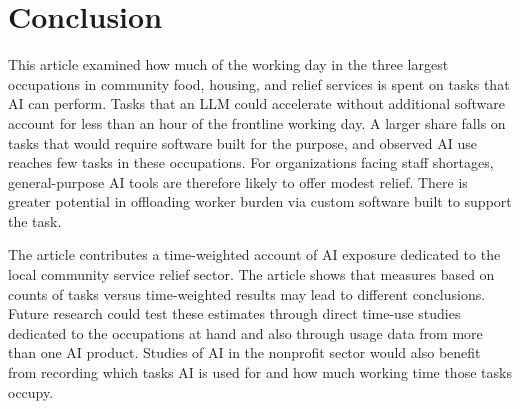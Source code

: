 \section{Conclusion}

This article examined how much of the working day in the three largest occupations in community food, housing, and relief services is spent on tasks that AI can perform. Tasks that an LLM could accelerate without additional software account for less than an hour of the frontline working day. A larger share falls on tasks that would require software built for the purpose, and observed AI use reaches few tasks in these occupations. For organizations facing staff shortages, general-purpose AI tools are therefore likely to offer modest relief. There is greater potential in offloading worker burden via custom software built to support the task.

The article contributes a time-weighted account of AI exposure dedicated to the local community service relief sector. The article shows that measures based on counts of tasks versus time-weighted results may lead to different conclusions. Future research could test these estimates through direct time-use studies dedicated to the occupations at hand and also through usage data from more than one AI product. Studies of AI in the nonprofit sector would also benefit from recording which tasks AI is used for and how much working time those tasks occupy.

